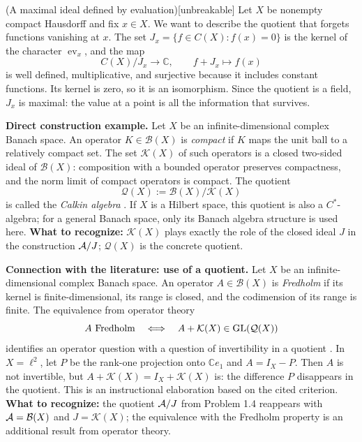 \begin{cthejemplo}{(A maximal ideal defined by evaluation)}[unbreakable]
Let $X$ be nonempty compact Hausdorff and fix $x\in X$.
We want to describe the quotient that forgets functions vanishing at $x$.
The set $J_x=\{f\in C(X):f(x)=0\}$ is the kernel of the character
$\operatorname{ev}_x$, and the map
\[
 C(X)/J_x\longrightarrow\mathbb C,\qquad f+J_x\longmapsto f(x)
\]
is well defined, multiplicative, and surjective because it includes
constant functions. Its kernel is zero, so it is an
isomorphism. Since the quotient is a field, $J_x$ is maximal:
the value at a point is all the information that survives.
\end{cthejemplo}

\begin{investigacion}
\textbf{Direct construction example.}
Let $X$ be an infinite-dimensional complex Banach space.
An operator $K\in\mathcal B(X)$ is \emph{compact} if
$K$ maps the unit ball to a relatively compact set. The set
$\mathcal K(X)$ of such operators is a closed two-sided ideal of $\mathcal B(X)$:
composition with a bounded operator preserves compactness, and the norm limit
of compact operators is compact. The quotient
\[
 \mathcal Q(X):=\mathcal B(X)/\mathcal K(X)
\]
is called the \emph{Calkin algebra} \cite[p.~2]{Karlovich2025}.
If $X$ is a Hilbert space, this quotient is also a
$C^*$-algebra; for a general Banach space, only its Banach algebra structure is used here.
\textbf{What to recognize:} $\mathcal K(X)$ plays exactly the role of the
closed ideal $J$ in the construction $\mathcal A/J$; $\mathcal Q(X)$ is the concrete quotient.
\end{investigacion}

\begin{investigacion}
\textbf{Connection with the literature: use of a quotient.}
Let $X$ be an infinite-dimensional complex Banach space.
An operator $A\in\mathcal B(X)$ is \emph{Fredholm} if its kernel is finite-dimensional,
its range is closed, and the codimension of its range is finite. The equivalence from
operator theory
\[
 A\text{ Fredholm}\quad\Longleftrightarrow\quad
 A+\mathcal K(X)\in\operatorname{GL}(\mathcal Q(X))
\]
identifies an operator question with a question of invertibility in a
quotient \cite[p.~2]{Karlovich2025}. In $X=\ell^2$, let $P$ be the rank-one projection
onto $\mathbb Ce_1$ and $A=I_X-P$. Then $A$ is not invertible, but
$A+\mathcal K(X)=I_X+\mathcal K(X)$ is: the difference $P$ disappears
in the quotient. This is an instructional elaboration based on the cited criterion.
\textbf{What to recognize:} the quotient $\mathcal A/J$ from Problem 1.4 reappears with
$\mathcal A=\mathcal B(X)$ and $J=\mathcal K(X)$; the equivalence with the Fredholm property is
an additional result from operator theory.
\end{investigacion}


